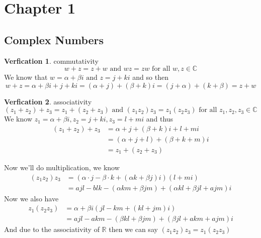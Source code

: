 \documentclass[11pt]{article}
\theoremstyle{definition}
\newtheorem{ver}{Verfication}[section]
\begin{document}
\section{Chapter 1}%
\label{sec:chapter_1}

\subsection{Complex Numbers}%
\label{sub:complex_numbers}

\begin{ver}
    commutativity
    \begin{equation*}
        w + z = z + w \text{ and } wz = zw \text{ for all } w, z \in \mathbb{C}
    \end{equation*}
    We know that $w = \alpha + \beta i  \text{ and } z = j + k i  $ and so then 
    \begin{equation*}
        w + z = \alpha + \beta i + j + k i = \left( \alpha + j \right) + \left( \beta +k \right)i = \left( j + \alpha  \right) + \left( k + \beta  \right) = z + w
    \end{equation*}
\end{ver}

\begin{ver}
    associativity 
    \begin{equation*}
        \left( z_1 + z_2 \right) + z_3 = z_1 + \left( z_2 + z_3 \right) \text{ and } \left( z_1 z_2 \right)z_3 = z_1\left( z_2z_3 \right) \text{ for all } z_1, z_2, z_3 \in \mathbb{C}
    \end{equation*}
    We know $z_1 = \alpha + \beta i, z_2 = j + k i, z_3 = l + m i$ and thus 
    \begin{align*}
        \left( z_1 + z_2 \right) + z_3 &= \alpha  + j + \left( \beta  + k \right) i + l + m i \\
                                       &= \left( \alpha + j + l \right) + \left( \beta + k + m \right) i \\
                                       &= z_1 + \left( z_2 + z_3 \right) 
    \end{align*}

    Now we'll do multiplication, we know
    \begin{align*}
        \left( z_1z_2 \right)z_3 &= \left(   \alpha  \cdot j - \beta  \cdot k + \left( \alpha k + \beta j \right) i \right) \left( l + m i \right) \\
                                 &= ajl - blk - \left( \alpha km + \beta jm \right) + \left( \alpha kl + \beta jl + ajm \right) i
    \end{align*}
    Now we also have
    \begin{align*}
        z_1\left( z_2z_3 \right) &= \alpha + \beta i\left( jl - km + \left( kl + jm \right)i \right)\\
                                 &= ajl - akm - \left( \beta kl + \beta jm \right) + \left( \beta jl + akm + ajm \right) i
    \end{align*}
    And due to the associativity of $\mathbb{R}$ then we can say $\left( z_1z_2 \right)z_3 = z_1 \left( z_2z_3 \right)$ 
\end{ver}
\end{document}
